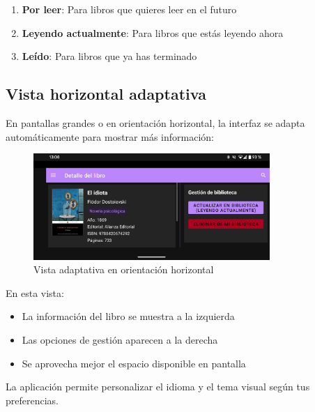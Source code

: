 \documentclass[a4paper,12pt]{report}
\begin{document}
      \begin{enumerate}
        \item \textbf{Por leer}: Para libros que quieres leer en el futuro
        \item \textbf{Leyendo actualmente}: Para libros que estás leyendo ahora
        \item \textbf{Leído}: Para libros que ya has terminado
      \end{enumerate}
    
    \subsection{Vista horizontal adaptativa}
    
    En pantallas grandes o en orientación horizontal, la interfaz se adapta automáticamente para mostrar más información:
    
    \begin{figure}[H]
      \centering
      \includegraphics[width=0.8\textwidth]{.img/libro-land.png}
      \caption{Vista adaptativa en orientación horizontal}
      \label{fig:libro-land}
    \end{figure}
    
    En esta vista:
    \begin{itemize}
      \item La información del libro se muestra a la izquierda
      \item Las opciones de gestión aparecen a la derecha
      \item Se aprovecha mejor el espacio disponible en pantalla
    \end{itemize}
    
    
    La aplicación permite personalizar el idioma y el tema visual según tus preferencias.
    
\end{document}
